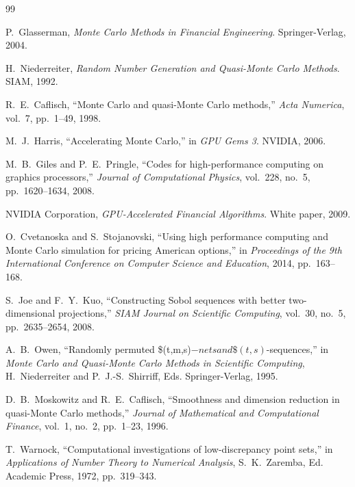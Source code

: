 \documentclass[11pt,a4paper]{article}
\begin{document}
\begin{thebibliography}{99}

P.~Glasserman, \emph{Monte Carlo Methods in Financial Engineering}. Springer-Verlag, 2004.

H.~Niederreiter, \emph{Random Number Generation and Quasi-Monte Carlo Methods}. SIAM, 1992.

R.~E.~Caflisch, ``Monte Carlo and quasi-Monte Carlo methods,'' \emph{Acta Numerica}, vol.~7, pp.~1--49, 1998.

M.~J.~Harris, ``Accelerating Monte Carlo,'' in \emph{GPU Gems 3}. NVIDIA, 2006.

M.~B.~Giles and P.~E.~Pringle, ``Codes for high-performance computing on graphics processors,'' \emph{Journal of Computational Physics}, vol.~228, no.~5, pp.~1620--1634, 2008.

NVIDIA Corporation, \emph{GPU-Accelerated Financial Algorithms}. White paper, 2009.

O.~Cvetanoska and S.~Stojanovski, ``Using high performance computing and Monte Carlo simulation for pricing American options,'' in \emph{Proceedings of the 9th International Conference on Computer Science and Education}, 2014, pp.~163--168.

S.~Joe and F.~Y.~Kuo, ``Constructing Sobol sequences with better two-dimensional projections,'' \emph{SIAM Journal on Scientific Computing}, vol.~30, no.~5, pp.~2635--2654, 2008.

A.~B.~Owen, ``Randomly permuted \$(t,m,s)$-nets and \$(t,s)$-sequences,'' in \emph{Monte Carlo and Quasi-Monte Carlo Methods in Scientific Computing}, H.~Niederreiter and P.~J.-S.~Shirriff, Eds. Springer-Verlag, 1995.

D.~B.~Moskowitz and R.~E.~Caflisch, ``Smoothness and dimension reduction in quasi-Monte Carlo methods,'' \emph{Journal of Mathematical and Computational Finance}, vol.~1, no.~2, pp.~1--23, 1996.

T.~Warnock, ``Computational investigations of low-discrepancy point sets,'' in \emph{Applications of Number Theory to Numerical Analysis}, S.~K.~Zaremba, Ed. Academic Press, 1972, pp.~319--343.

\end{thebibliography}
\end{document}
